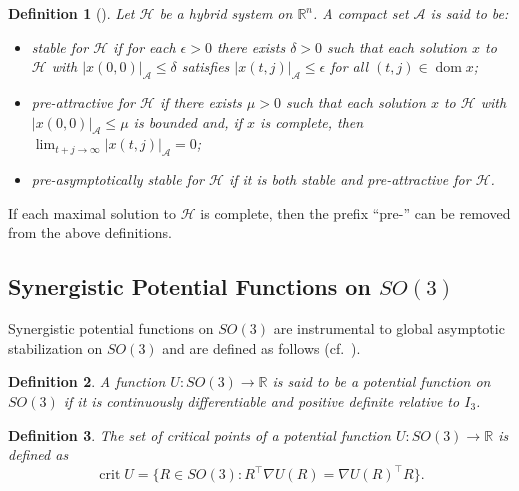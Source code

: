 \documentclass[journal]{IEEEtran}
\newtheorem{definition}{Definition}
\newcommand{\tp}{^\top}
\newcommand{\eye}[1]{I_{#1}}
\DeclareMathOperator{\crit}{crit}
\DeclareMathOperator{\dom}{dom}
\begin{document}
\begin{definition}[{\cite[Definition~7.1]{goebel_hybrid_2012}}]
Let $\mathcal{H}$ be a hybrid system on $\mathbb{R}^n$. A compact set $\mathcal{A}$ is said to be:
\begin{itemize}
  \item stable for $\mathcal{H}$ if for each $\epsilon>0$ there exists $\delta>0$ such that each solution $x$ to $\mathcal{H}$ with $|x(0,0)|_\mathcal{A}\leq\delta$ satisfies $|x(t,j)|_\mathcal{A}\leq\epsilon$ for all $(t,j)\in\dom x$;
  \item pre-attractive for $\mathcal{H}$ if there exists $\mu>0$ such that each solution $x$ to $\mathcal{H}$ with $|x(0,0)|_\mathcal{A}\leq\mu$ is bounded and, if $x$ is complete, then $\lim_{t+j\to\infty}|x(t,j)|_\mathcal{A}=0$;
  \item pre-asymptotically stable for $\mathcal{H}$ if it is both stable and pre-attractive for $\mathcal{H}$.
\end{itemize}
\end{definition}
If each maximal solution to $\mathcal{H}$ is complete, then the prefix ``pre-'' can be removed from the above definitions.

\subsection{Synergistic Potential Functions on $SO(3)$}

Synergistic potential functions on $SO(3)$ are instrumental to global asymptotic stabilization on $SO(3)$ and are defined as follows (cf.~\cite{mayhew_synergistic_2013}).

\begin{definition}
A function $U:SO(3)\to\mathbb{R}$ is said to be a \emph{potential function on $SO(3)$} if it is continuously differentiable and positive definite relative to $\eye{3}$.
\end{definition}

\begin{definition}
The set of critical points of a potential function $U:SO(3)\to\mathbb{R}$ is defined as
$$\crit U = \{R\in SO(3): R\tp\nabla U(R) = \nabla U(R)\tp R\}.$$
\end{definition}
\end{document}
